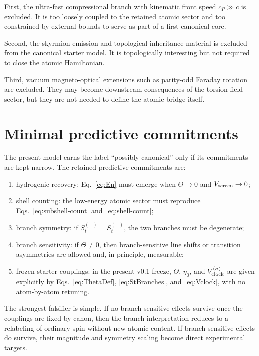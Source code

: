 \documentclass[11pt,a4paper]{article}
\begin{document}
First, the ultra-fast compressional branch with kinematic front speed $c_P\gg c$ is excluded. It is too loosely coupled to the retained atomic sector and too constrained by external bounds to serve as part of a first canonical core.

Second, the skyrmion-emission and topological-inheritance material is excluded from the canonical starter model. It is topologically interesting but not required to close the atomic Hamiltonian.

Third, vacuum magneto-optical extensions such as parity-odd Faraday rotation are excluded. They may become downstream consequences of the torsion field sector, but they are not needed to define the atomic bridge itself.

\section{Minimal predictive commitments}
The present model earns the label ``possibly canonical'' only if its commitments are kept narrow. The retained predictive commitments are:
\begin{enumerate}[label=(P\arabic*)]
    \item hydrogenic recovery: Eq.~\eqref{eq:En} must emerge when $\Theta\to 0$ and $V_{\rm screen}\to 0$;
    \item shell counting: the low-energy atomic sector must reproduce Eqs.~\eqref{eq:subshell-count} and~\eqref{eq:shell-count};
    \item branch symmetry: if $S_t^{(+)}=S_t^{(-)}$, the two branches must be degenerate;
    \item branch sensitivity: if $\Theta\neq 0$, then branch-sensitive line shifts or transition asymmetries are allowed and, in principle, measurable;
    \item frozen starter couplings: in the present v0.1 freeze, $\Theta$, $\eta_0$, and $V_{\rm clock}^{(\sigma)}$ are given explicitly by Eqs.~\eqref{eq:ThetaDef}, \eqref{eq:StBranches}, and~\eqref{eq:Vclock}, with no atom-by-atom retuning.
\end{enumerate}

The strongest falsifier is simple. If no branch-sensitive effects survive once the couplings are fixed by canon, then the branch interpretation reduces to a relabeling of ordinary spin without new atomic content. If branch-sensitive effects do survive, their magnitude and symmetry scaling become direct experimental targets.
\end{document}
